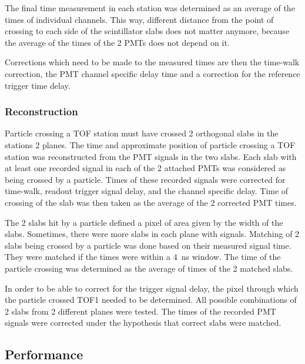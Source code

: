 The final time measurement in each station was determined as an average of
the times of individual channels. This way, different distance from
the point of crossing to each side of the scintillator slabs does not
matter anymore, because the average of the times of the 2 PMTs does
not depend on it.

Corrections which need to be made to the measured times are then the
time-walk correction, the PMT channel specific delay time and
a correction for the reference trigger time delay\cite{NOTE251}.

\subsubsection{Reconstruction}

Particle crossing a TOF station must have crossed 2 orthogonal slabs
in the stations 2 planes.  The time and approximate position of
particle crossing a TOF station was reconstructed from the PMT signals
in the two slabs. Each slab with at least one recorded signal in each
of the 2 attached PMTs was considered as being crossed by a
particle. Times of these recorded signals were corrected for
time-walk, readout trigger signal delay, and the channel specific
delay. Time of crossing of the slab was then taken as the average of
the 2 corrected PMT times.

The 2 slabs hit by a particle defined a pixel of area given by the
width of the slabs. Sometimes, there were more slabs in each plane
with signals. Matching of 2 slabs being crossed by a particle was done
based on their measured signal time. They were matched if the times
were within a 4~ns window. The time of the particle crossing was
determined as the average of times of the 2 matched slabs.


In order to be able to correct for the trigger signal delay, the pixel
through which the particle crossed TOF1 needed to be determined. All
possible combinations of 2 slabs from 2 different planes were
tested. The times of the recorded PMT signals were corrected under the
hypothesis that correct slabs were matched.


\subsection{Performance}
\label{SubSect:TOF_Performance}

